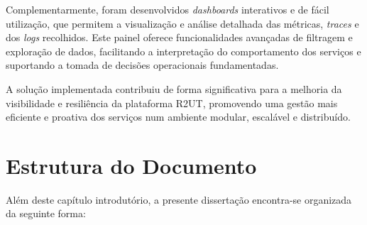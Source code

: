 Complementarmente, foram desenvolvidos \textit{dashboards} interativos e de fácil utilização, que permitem a visualização e análise detalhada das métricas, \textit{traces} e dos \textit{logs} recolhidos. Este painel oferece funcionalidades avançadas de filtragem e exploração de dados, facilitando a interpretação do comportamento dos serviços e suportando a tomada de decisões operacionais fundamentadas.

A solução implementada contribuiu de forma significativa para a melhoria da visibilidade e resiliência da plataforma R2UT, promovendo uma gestão mais eficiente e proativa dos serviços num ambiente modular, escalável e distribuído.

\break


\section{Estrutura do Documento}

Além deste capítulo introdutório, a presente dissertação encontra-se organizada da seguinte forma:

